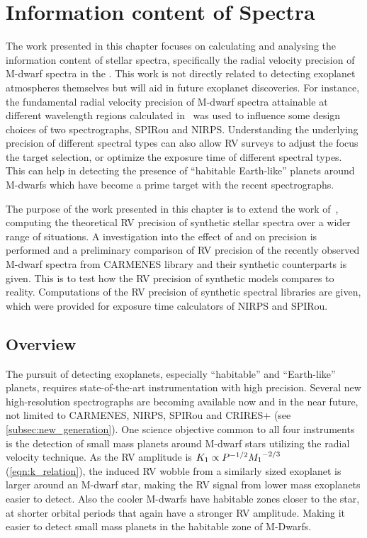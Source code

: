
\chapter{Information content of \nir{} Spectra}
\label{cha:nir_content}

The work presented in this chapter focuses on calculating and analysing the information content of stellar spectra, specifically the radial velocity precision of M-dwarf spectra in the \nir{}.
This work is not directly related to detecting exoplanet atmospheres themselves but will aid in future exoplanet discoveries.
For instance, the fundamental radial velocity precision of {M-dwarf} spectra attainable at different wavelength regions calculated in~\citet{figueira_radial_2016} was used to influence some design choices of two \nir{} spectrographs, {SPIRou} and {NIRPS}.
Understanding the underlying precision of different spectral types can also allow {RV} surveys to adjust the focus the target selection, or optimize the exposure time of different spectral types.
This can help in detecting the presence of ``habitable Earth-like'' planets around {M-dwarfs} which have become a prime target with the recent \nir{} spectrographs. 

The purpose of the work presented in this chapter is to extend the work of~\citet{figueira_radial_2016}, computing the theoretical {RV} precision of synthetic stellar spectra over a wider range of situations.
A investigation into the effect of \Logg{} and \feh{} on precision is performed and a preliminary comparison of {RV} precision of the recently observed \nir{} {M-dwarf} spectra from {CARMENES} library and their synthetic counterparts is given.
This is to test how the {RV} precision of synthetic models compares to reality.
Computations of the {RV} precision of synthetic spectral libraries are given, which were provided for exposure time calculators of {NIRPS} and {SPIRou}. 

\section{Overview}
\label{sec:precision_overview}
The pursuit of detecting exoplanets, especially ``habitable'' and ``Earth-like'' planets, requires state-of-the-art instrumentation with high precision.
Several new high-resolution \nir{} spectrographs are becoming available now and in the near future, not limited to {CARMENES}, {NIRPS}, {SPIRou} and {CRIRES+} (see \cref{subsec:new_generation}).
One science objective common to all four instruments is the detection of small mass planets around {M-dwarf} stars utilizing the radial velocity technique.
As the {RV} amplitude is \({K}_{1}\propto {P}^{-{1/2}}{{M}_{1}}^{-2/3}\) (\cref{eqn:k_relation}), the induced {RV} wobble from a similarly sized exoplanet is larger around an M-dwarf star, making the {RV} signal from lower mass exoplanets easier to detect.
Also the cooler M-dwarfs have habitable zones closer to the star, at shorter orbital periods that again have a stronger {RV} amplitude. Making it easier to detect small mass planets in the habitable zone of {M-Dwarfs}.

